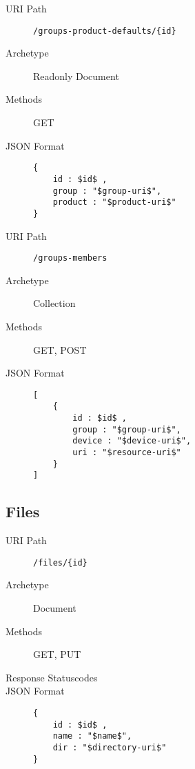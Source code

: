 \documentclass[10pt,a4paper]{scrartcl}
\begin{document}
\begin{mdframed}[style=def]
\begin{description}
	\item[URI Path] \texttt{/groups-product-defaults/\{id\}}
	\item[Archetype] Readonly Document
	\item[Methods] GET
	\item[JSON Format] \hfill
\begin{lstlisting}
{
	id : $id$ ,
	group : "$group-uri$",
	product : "$product-uri$"
}
\end{lstlisting}
\end{description}
\end{mdframed}

\begin{mdframed}[style=def]
\begin{description}
	\item[URI Path] \texttt{/groups-members}
	\item[Archetype] Collection
	\item[Methods] GET, POST
	\item[JSON Format] \hfill
\begin{lstlisting}
[
    {
    	id : $id$ ,
    	group : "$group-uri$",
    	device : "$device-uri$",
	    uri : "$resource-uri$"
    }
]
\end{lstlisting}
\end{description}
\end{mdframed}


\pagebreak
\subsection{Files}

\begin{mdframed}[style=def]
\begin{description}
	\item[URI Path] \texttt{/files/\{id\}}
	\item[Archetype] Document
	\item[Methods] GET, PUT
	\item[Response Statuscodes] \hfill
	\item[JSON Format] \hfill
\begin{lstlisting}
{
	id : $id$ ,
	name : "$name$",
	dir : "$directory-uri$"
}
\end{lstlisting}
\end{description}
\end{mdframed}
\end{document}
